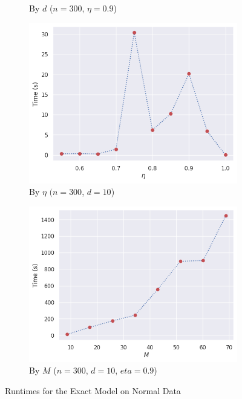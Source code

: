 \documentclass[11pt,twoside]{report}
\theoremstyle{definition}
\numberwithin{theorem}{section}
\numberwithin{definition}{section}
\numberwithin{lemma}{section}
\numberwithin{proposition}{section}
\numberwithin{equation}{section}
\numberwithin{figure}{section}
\begin{document}
\begin{figure}[ht]
\begin{subfigure}[b]{0.475\textwidth}
        \caption{By $d$ ($n=300$, $\eta=0.9$)}
        \label{fig:exact_benchmarks_d}
    \end{subfigure}
    \hfill
    \begin{subfigure}[b]{0.475\textwidth}
        \centering
        \includegraphics[width=\textwidth]{exact_benchmarks/func_eta_n300_d10_normal.png}
        \caption{By $\eta$ $(n=300$, $d=10$)}
        \label{fig:exact_benchmarks_eta}
    \end{subfigure}
    \hfill
    \begin{subfigure}[b]{0.475\textwidth}
        \centering
        \includegraphics[width=\textwidth]{exact_benchmarks/func_M_n300_d10_eta0p9_normal.png}
        \caption{By $M$ ($n=300$, $d=10$, $eta=0.9$)}
        \label{fig:exact_benchmarks_M}
    \end{subfigure}
    \caption{Runtimes for the Exact Model on Normal Data}
    \label{fig:exact_benchmarks}
\end{figure}
\end{document}
